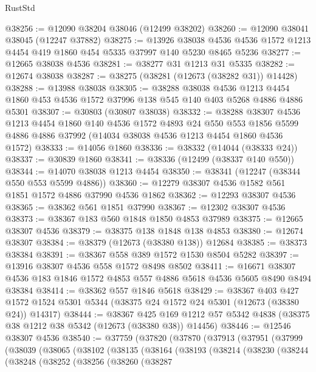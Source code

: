 \begin{lexlean}{RustStd}
\begin{coremodule}
@38256 := @12090 @38204 @38046 (@12499 @38202)
@38260 := @12090 @38041 @38045 (@12247 @37882)
@38275 := @13926
    @38038
    @4536
    @4536
    @1572
    @1213
    @4454
    @419
    @1860
    @454
    @5335
    @37997
    @140
    @5230
    @8465
    @5236
@38277 := @12665 @38038 @4536
@38281 := @38277 @31 @1213 @31 @5335
@38282 := @12674 @38038
@38287 := @38275 (@38281 (@12673 (@38282 @31)) @14428)
@38288 := @13988 @38038
@38305 := @38288
    @38038
    @4536
    @1213
    @4454
    @1860
    @453
    @4536
    @1572
    @37996
    @138
    @545
    @140
    @403
    @5268
    @4886
    @4886
    @5301
@38307 := @30803 (@30807 @38038)
@38332 := @38288
    @38307
    @4536
    @1213
    @4454
    @1860
    @140
    @4536
    @1572
    @4893
    @24
    @550
    @553
    @1856
    @5599
    @4886
    @4886
    @37992
    (@14034 @38038 @4536 @1213 @4454 @1860 @4536 @1572)
@38333 := @14056 @1860
@38336 := @38332 (@14044 (@38333 @24))
@38337 := @30839 @1860
@38341 := @38336 (@12499 (@38337 @140 @550))
@38344 := @14070 @38038 @1213 @4454
@38350 := @38341 (@12247 (@38344 @550 @553 @5599 @4886))
@38360 := @12279 @38307 @4536 @1582 @561 @1851 @1572 @4886 @37990 @4536 @1862
@38362 := @12293 @38307 @4536
@38365 := @38362 @561 @1851 @37990
@38367 := @12302 @38307 @4536
@38373 := @38367 @183 @560 @1848 @1850 @4853 @37989
@38375 := @12665 @38307 @4536
@38379 := @38375 @138 @1848 @138 @4853
@38380 := @12674 @38307
@38384 := @38379 (@12673 (@38380 @138)) @12684
@38385 := @38373 @38384
@38391 := @38367 @558 @389 @1572 @1530 @8504 @5282
@38397 := @13916 @38307 @4536 @558 @1572 @8498 @8502
@38411 := @16671 @38307 @4536 @183 @1846 @1572 @4853 @557 @4886 @5618 @4536 @5605 @8490 @8494 @38384
@38414 := @38362 @557 @1846 @5618
@38429 := @38367
    @403
    @427
    @1572
    @1524
    @5301
    @5344
    (@38375 @24 @1572 @24 @5301 (@12673 (@38380 @24)) @14317)
@38444 := @38367
    @425
    @169
    @1212
    @57
    @5342
    @4838
    (@38375 @38 @1212 @38 @5342 (@12673 (@38380 @38)) @14456)
@38446 := @12546 @38307 @4536
@38540 := @37759
    (@37820
      (@37870
        (@37913
          (@37951
            (@37999
              (@38039
                (@38065
                  (@38102
                    (@38135
                      (@38164
                        (@38193
                          (@38214
                            (@38230
                              (@38244
                                (@38248
                                  (@38252
                                    (@38256
                                      (@38260
                                        (@38287

\end{coremodule}
\end{lexlean}
